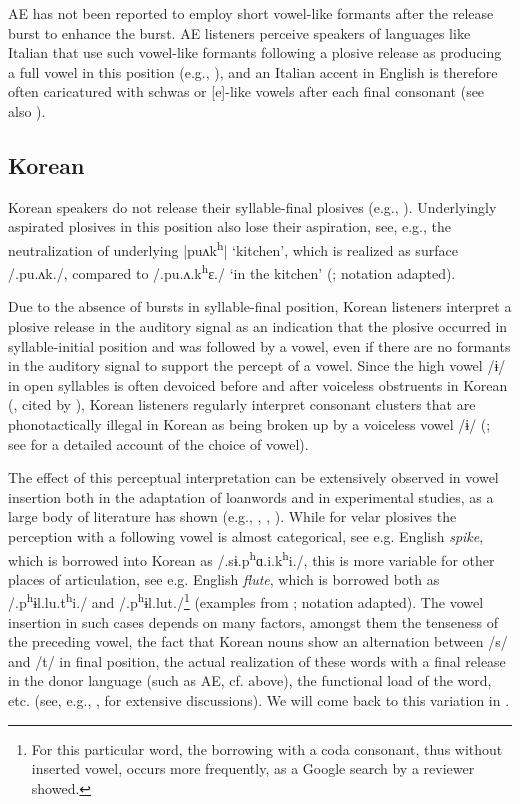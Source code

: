\documentclass[output=paper,colorlinks,citecolor=brown]{langscibook}
\begin{document}
AE has not been reported to employ short vowel-like formants after the release burst to enhance the burst.  AE listeners perceive speakers of languages like Italian that use such vowel-like formants following a plosive release as producing a full vowel in this position (e.g., \cite{Hall2006}), and an Italian accent in English is therefore often caricatured with schwas or [e]-like vowels after each final consonant (see also \cite{Busà2008}).

\subsection{Korean}\label{hamann:kor}
Korean speakers do not release their syllable-final plosives (e.g., \cite{Martin1951,Kim1998,Kang2003}). Underlyingly aspirated plosives in this position also lose their aspiration, see, e.g., the neutralization of underlying |puʌk\textsuperscript{h}| ‘kitchen’, which is realized as surface /.pu.ʌk./, compared to /.pu.ʌ.k\textsuperscript{h}ɛ./ ‘in the kitchen’ (\cite[224]{Kang2003}; notation adapted).

Due to the absence of bursts in syllable-final position, Korean listeners interpret a plosive release in the auditory signal as an indication that the plosive occurred in syllable-initial position and was followed by a vowel, even if there are no formants in the auditory signal to support the percept of a vowel. Since the high vowel /ɨ/ in open syllables is often devoiced before and after voiceless obstruents in Korean (\cite{Kim-Renaud1987}, cited by \cite[236]{Kang2003}), Korean listeners regularly interpret consonant clusters that are phonotactically illegal in Korean as being broken up by a voiceless vowel /ɨ/ (\cite{Kang2003}; see \cite{Durvasulaetal2018} for a detailed account of the choice of vowel).

The effect of this perceptual interpretation can be extensively observed in vowel insertion both in the adaptation of loanwords and in experimental studies, as a large body of literature has shown (e.g., \cite{DurvasulaKahng2015}, \citeyear{DurvasulaKahng2016}, \cite{Hutin2014,Kang1996,Kang2003,KabakIdsardi2007,IversonLee2006}). While for velar plosives the perception with a following vowel is almost categorical, see e.g. English  \textit{spike}, which is borrowed into Korean as /.sɨ.p\textsuperscript{h}ɑ.i.k\textsuperscript{h}i./, this is more variable for other places of articulation, see e.g. English \textit{flute}, which is borrowed both as /.p\textsuperscript{h}ɨl.lu.t\textsuperscript{h}i./ and /.p\textsuperscript{h}ɨl.lut./\footnote{For this particular word, the borrowing with a coda consonant, thus without inserted vowel, occurs more frequently, as a Google search by a reviewer showed.} (examples from \cite{Kang2003}; notation adapted). The vowel insertion in such cases depends on many factors, amongst them the tenseness of the preceding vowel, the fact that Korean nouns show an alternation between /s/ and /t/ in final position, the actual realization of these words with a final release in the donor language (such as AE, cf.  above), the functional load of the word, etc. (see, e.g., \cite{Kang2003,Chang2018,Kim2022}, for extensive discussions). We will come back to this variation in .
\end{document}
